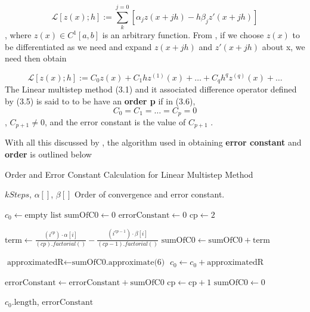 \documentclass[a4paper, twoside]{report} %
\begin{document}
	\begin{equation}
		\mathcal{L}[z(x);h] := \sum_{k}^{j=0}[\alpha_jz(x+jh)-h\beta_jz'(x+jh)]
	\end{equation}, where $z(x) \in C^1[a,b]$ is an arbitrary function. From \cite{lambert1977}, if we choose $z(x)$ to be differentiated as we need and expand $z(x+jh)$ and $z'(x+jh)$ about x, we need then obtain

	\begin{equation}
		\mathcal{L}[z(x);h] := C_0z(x)+ C_1hz^{(1)}(x)+ \dots + C_qh^qz^{(q)}(x)+ \dots
	\end{equation}
	The Linear multistep method (3.1) and it associated difference operator defined by (3.5) is said to to be have an \textbf{order p} if in (3.6), \[C_0 = C_1 = \dots = C_p = 0 \], $C_{p+1} \neq 0$, and the error constant is the value of $C_{p+1}$ \cite{lambert1977}.

	With all this discussed by \cite{lambert1977}, the algorithm used in obtaining \textbf{error constant} and \textbf{order} is outlined below

	\begin{algorithm}
		\caption{Order and Error Constant Calculation for Linear Multistep Method}
		\label{alg:order_error_constant}

		\begin{algorithmic}
			\REQUIRE \(kSteps\), \( \alpha[] \), \( \beta[] \)
			\ENSURE Order of convergence and error constant.

			\STATE \( c_0 \gets \text{empty list} \)
			\STATE \( \text{sumOfC0} \gets 0 \)
			\STATE \( \text{errorConstant} \gets 0 \)
			\STATE \( \text{cp} \gets 2 \) %

			\STATE \( \text{term} \gets \frac{(i^{cp}) \cdot \alpha[i]}{(cp).factorial()} - \frac{(i^{cp - 1}) \cdot \beta[i]}{(cp - 1).factorial()} \)
			\STATE \( \text{sumOfC0} \gets \text{sumOfC0} + \text{term} \)

			\STATE \( \text{approximatedR} \gets \text{sumOfC0.approximate(6)} \)
			\STATE \( c_0 \gets c_0 + \text{approximatedR} \)
			\ENDIF
			\ENDFOR

			\STATE \( \text{errorConstant} \gets \text{errorConstant} + \text{sumOfC0} \)
			\STATE \( \text{cp} \gets \text{cp} + 1 \)
			\STATE \( \text{sumOfC0} \gets 0 \)
			\STATE {}
			\ENDIF
			\STATE {} %
			\ELSE
			\STATE {}
			\ENDIF

			\ENDWHILE

			\RETURN \( c_0.\text{length} \), \( \text{errorConstant} \)

		\end{algorithmic}
	\end{algorithm}
\end{document}
